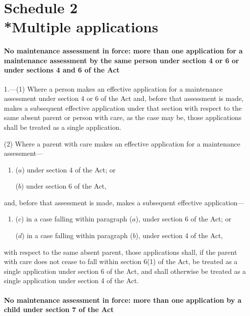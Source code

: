 \documentclass[a4paper,12pt]{article}
\begin{document}

\part[Schedule 2 --- Multiple applications]{Schedule 2\\*Multiple applications}

\renewcommand\parthead{--- Schedule 2}

\subsection*{No maintenance assessment in force: more than one application for a maintenance assessment by the same person under section 4 or 6 or under sections 4 and 6 of the Act}

1.—(1) Where a person makes an effective application for a maintenance assessment under section 4 or 6 of the Act and, before that assessment is made, makes a subsequent effective application under that section with respect to the same absent parent or person with care, as the case may be, those applications shall be treated as a single application.

(2) Where a parent with care makes an effective application for a maintenance assessment—
\begin{enumerate}\item[]
($a$) under section 4 of the Act; or

($b$) under section 6 of the Act,
\end{enumerate}
and, before that assessment is made, makes a subsequent effective application—
\begin{enumerate}\item[]
($c$) in a case falling within paragraph ($a$), under section 6 of the Act; or

($d$) in a case falling within paragraph ($b$), under section 4 of the Act,
\end{enumerate}
with respect to the same absent parent, those applications shall, if the parent with care does not cease to fall within section 6(1) of the Act, be treated as a single application under section 6 of the Act, and shall otherwise be treated as a single application under section 4 of the Act.

\subsection*{No maintenance assessment in force: more than one application by a child under section 7 of the Act}
\end{document}
